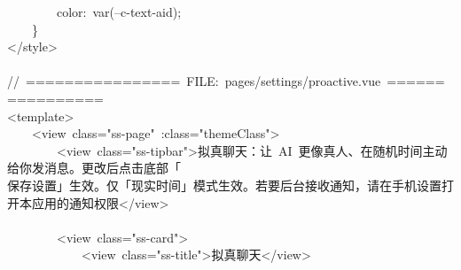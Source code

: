 \documentclass[a4paper,10pt]{article}
\begin{document}
{~~~~~~~~color:~var(--c-text-aid);\\
~~~~\}\\
</style>\\
\mbox{}\\
//~================~FILE:~pages/settings/proactive.vue~================\\
<template>\\
~~~~<view~class="ss-page"~:class="themeClass">\\
~~~~~~~~<view~class="ss-tipbar">拟真聊天：让~AI~更像真人、在随机时间主动给你发消息。更改后点击底部「\\
保存设置」生效。仅「现实时间」模式生效。若要后台接收通知，请在手机设置打开本应用的通知权限</view>\\
\mbox{}\\
~~~~~~~~<view~class="ss-card">\\
~~~~~~~~~~~~<view~class="ss-title">拟真聊天</view>
}

\newpage
\end{document}
